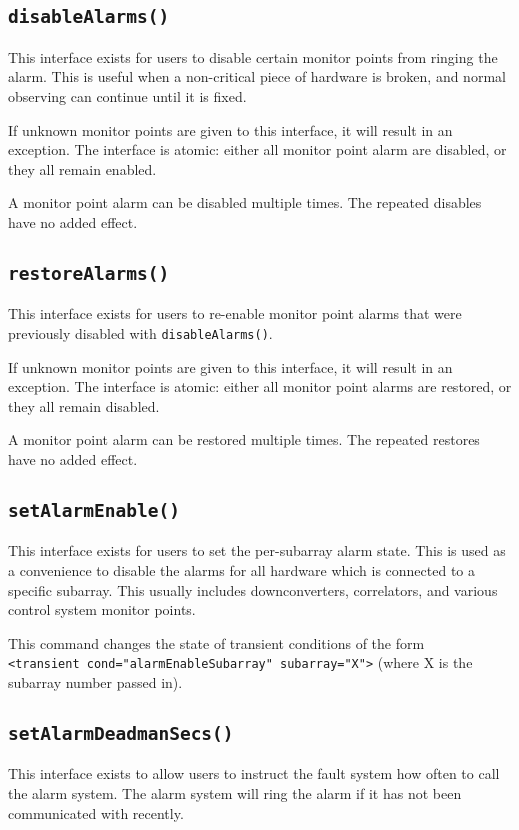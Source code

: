 \documentclass[letterpaper,12pt,oneside,pdftex]{article}
\begin{document}
\subsection{\texttt{disableAlarms()}}
This interface exists for users to disable certain monitor points from ringing
the alarm. This is useful when a non-critical piece of hardware is broken, and
normal observing can continue until it is fixed.

If unknown monitor points are given to this interface, it will result in an
exception. The interface is atomic: either all monitor point alarm are disabled,
or they all remain enabled.

A monitor point alarm can be disabled multiple times. The repeated disables have
no added effect.

\subsection{\texttt{restoreAlarms()}}
This interface exists for users to re-enable monitor point alarms that were
previously disabled with \texttt{disableAlarms()}.

If unknown monitor points are given to this interface, it will result in an
exception. The interface is atomic: either all monitor point alarms are
restored, or they all remain disabled.

A monitor point alarm can be restored multiple times. The repeated restores have
no added effect.

\subsection{\texttt{setAlarmEnable()}}
This interface exists for users to set the per-subarray alarm state. This is
used as a convenience to disable the alarms for all hardware which is connected
to a specific subarray. This usually includes downconverters, correlators, and
various control system monitor points.

This command changes the state of transient conditions of the form \\
\verb|<transient cond="alarmEnableSubarray" subarray="X">| (where X is the
subarray number passed in).

\subsection{\texttt{setAlarmDeadmanSecs()}}
This interface exists to allow users to instruct the fault system how often to
call the alarm system. The alarm system will ring the alarm if it has not been
communicated with recently.
\end{document}

